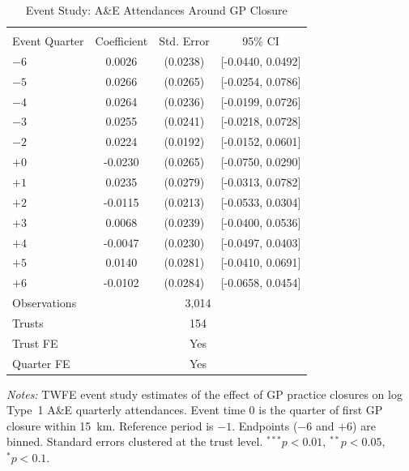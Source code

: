 \begin{table}[t]
\centering
\caption{Event Study: A\&E Attendances Around GP Closure}
\label{tab:eventstudy}
\begin{tabular}{lccc}
\hline\hline
\\[-1.8ex]
Event Quarter & Coefficient & Std. Error & 95\% CI \\
\hline
$-6$ & 0.0026 & (0.0238) & [-0.0440, 0.0492] \\
$-5$ & 0.0266 & (0.0265) & [-0.0254, 0.0786] \\
$-4$ & 0.0264 & (0.0236) & [-0.0199, 0.0726] \\
$-3$ & 0.0255 & (0.0241) & [-0.0218, 0.0728] \\
$-2$ & 0.0224 & (0.0192) & [-0.0152, 0.0601] \\
$+0$ & -0.0230 & (0.0265) & [-0.0750, 0.0290] \\
$+1$ & 0.0235 & (0.0279) & [-0.0313, 0.0782] \\
$+2$ & -0.0115 & (0.0213) & [-0.0533, 0.0304] \\
$+3$ & 0.0068 & (0.0239) & [-0.0400, 0.0536] \\
$+4$ & -0.0047 & (0.0230) & [-0.0497, 0.0403] \\
$+5$ & 0.0140 & (0.0281) & [-0.0410, 0.0691] \\
$+6$ & -0.0102 & (0.0284) & [-0.0658, 0.0454] \\
\hline
Observations & \multicolumn{3}{c}{3,014} \\
Trusts & \multicolumn{3}{c}{154} \\
Trust FE & \multicolumn{3}{c}{Yes} \\
Quarter FE & \multicolumn{3}{c}{Yes} \\
\hline\hline
\end{tabular}
\begin{tablenotes}
\small
\item \textit{Notes:} TWFE event study estimates of the effect of GP practice closures on log Type~1 A\&E quarterly attendances. Event time 0 is the quarter of first GP closure within 15~km. Reference period is $-1$. Endpoints ($-6$ and $+6$) are binned. Standard errors clustered at the trust level. $^{***}p<0.01$, $^{**}p<0.05$, $^{*}p<0.1$.
\end{tablenotes}
\end{table}
